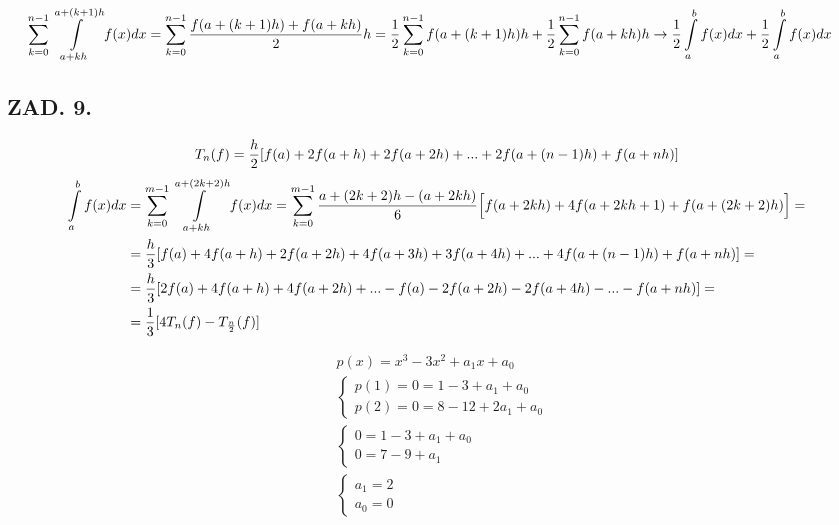 \documentclass{article}[16pt]
\begin{document}
\begin{align*}
    \sum\limits_{k=0}^{n-1}\int\limits_{a+kh}^{a+(k+1)h}f(x)dx&=\sum\limits_{k=0}^{n-1}{f(a+(k+1)h)+f(a+kh)\over 2}h=\frac12\sum\limits_{k=0}^{n-1}f(a+(k+1)h)h+\frac12\sum\limits_{k=0}^{n-1}f(a+kh)h\to\frac12\int\limits_a^bf(x)dx+\frac12\int\limits_a^bf(x)dx
\end{align*}

\subsection*{ZAD. 9.}

$$T_n(f)={h\over 2}[f(a)+2f(a+h)+2f(a+2h)+...+2f(a+(n-1)h)+f(a+nh)]$$
\begin{align*}
    \int\limits_a^bf(x)dx&=\sum\limits_{k=0}^{m-1}\int\limits_{a+kh}^{a+(2k+2)h}f(x)dx=\sum\limits_{k=0}^{m-1}{a+(2k+2)h-(a+2kh)\over6}\Big[f(a+2kh)+4f(a+2kh+1)+f(a+(2k+2)h)\Big]=\\
    &={h\over3}[f(a)+4f(a+h)+2f(a+2h)+4f(a+3h)+3f(a+4h)+...+4f(a+(n-1)h)+f(a+nh)]=\\
    &={h\over3}[2f(a)+4f(a+h)+4f(a+2h)+...-f(a)-2f(a+2h)-2f(a+4h)-...-f(a+nh)]=\\
    &=\frac13[4T_n(f)-T_{\frac n2}(f)]
\end{align*}


\begin{align*}
    &p(x)=x^3-3x^2+a_1x+a_0\\
    &\begin{cases}
        p(1)=0=1-3+a_1+a_0\\
        p(2)=0=8-12+2a_1+a_0
    \end{cases}\\
    &\begin{cases}
        0=1-3+a_1+a_0\\
        0=7-9+a_1
    \end{cases}\\
    &\begin{cases}
        a_1=2\\
        a_0=0
    \end{cases}
\end{align*}
\end{document}
